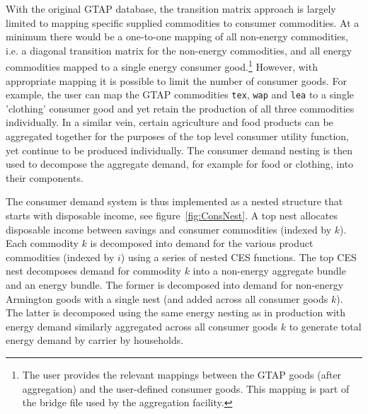 \documentclass[11pt,letterpaper]{report}
\begin{document}
With the original GTAP database, the transition matrix approach is largely
limited to mapping specific supplied commodities to consumer commodities. At a
minimum there would be a one-to-one mapping of all non-energy commodities, i.e.
a diagonal transition matrix for the non-energy commodities, and all energy
commodities mapped to a single energy consumer good.\footnote{The user provides
the relevant mappings between the GTAP goods (after aggregation) and the
user-defined consumer goods. This mapping is part of the bridge file used by the
aggregation facility.} However, with appropriate mapping it is possible to limit
the number of consumer goods. For example, the user can map the GTAP commodities
\texttt{tex}, \texttt{wap} and \texttt{lea} to a single 'clothing' consumer good
and yet retain the production of all three commodities individually. In a
similar vein, certain agriculture and food products can be aggregated together
for the purposes of the top level consumer utility function, yet continue to be
produced individually. The consumer demand nesting is then used to decompose the
aggregate demand, for example for food or clothing, into their components.

The consumer demand system is thus implemented as a nested structure that starts
with disposable income, see figure~\ref{fig:ConsNest}. A top nest allocates
disposable income between savings and consumer commodities (indexed by $k$).
Each commodity $k$ is decomposed into demand for the various product commodities
(indexed by $i$) using a series of nested CES functions. The top CES nest
decomposes demand for commodity $k$ into a non-energy aggregate bundle and an
energy bundle. The former is decomposed into demand for non-energy Armington
goods with a single nest (and added across all consumer goods $k$). The latter
is decomposed using the same energy nesting as in production with energy demand
similarly aggregated across all consumer goods $k$ to generate total energy
demand by carrier by households.
\end{document}
